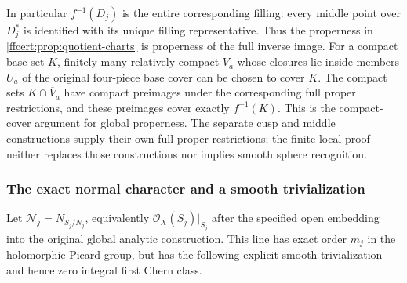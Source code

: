 In particular $f^{-1}(D_j)$ is the entire corresponding filling:
every middle point over $D_j^*$ is identified with its unique filling
representative. Thus the properness in
\cref{ffcert:prop:quotient-charts} is properness of the full inverse
image. For a compact base set $K$, finitely many relatively compact
$V_a$ whose closures lie inside members $U_a$ of the original
four-piece base cover can be chosen to cover $K$. The compact sets
$K\cap\overline V_a$ have compact preimages under the corresponding
full proper restrictions, and these preimages cover exactly
$f^{-1}(K)$. This is the compact-cover argument for global properness.
The separate cusp and middle constructions supply their own full
proper restrictions; the finite-local proof neither replaces those
constructions nor implies smooth sphere recognition.

\subsubsection{The exact normal character and a smooth trivialization}

\begin{theorem}
\label{ffcert:thm:normal-trivialization}
Let $\mathcal N_j=N_{S_j/N_j}$, equivalently
$\mathcal O_X(S_j)|_{S_j}$ after the specified open embedding into
the original global analytic construction. This line has exact order
$m_j$ in the holomorphic Picard group, but has the following explicit
smooth trivialization and hence zero integral first Chern class.
\end{theorem}

